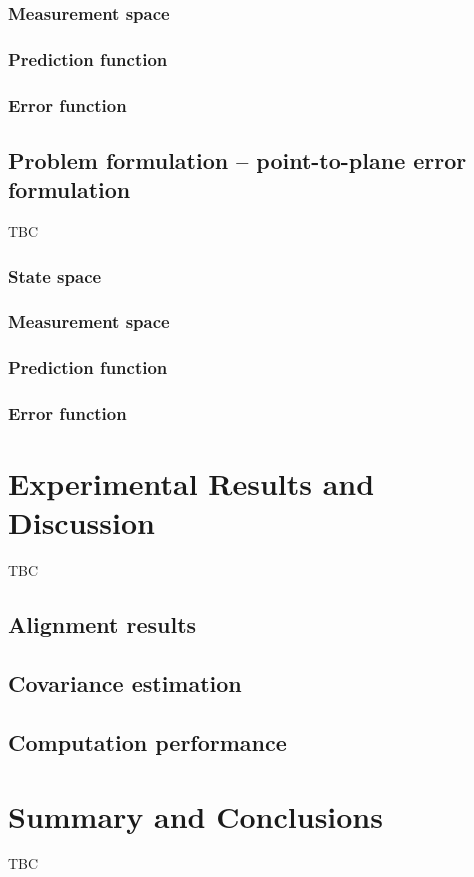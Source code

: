 \subsubsection{Measurement space}
\subsubsection{Prediction function}
\subsubsection{Error function}

\subsection{Problem formulation -- point-to-plane error formulation}

TBC

\subsubsection{State space}
\subsubsection{Measurement space}
\subsubsection{Prediction function}
\subsubsection{Error function}

\section{Experimental Results and Discussion}\label{sec:distance-maps:results}

TBC

\subsection{Alignment results}
\subsection{Covariance estimation}
\subsection{Computation performance}

\section{Summary and Conclusions}\label{sec:distance-maps:conclusions}

TBC
